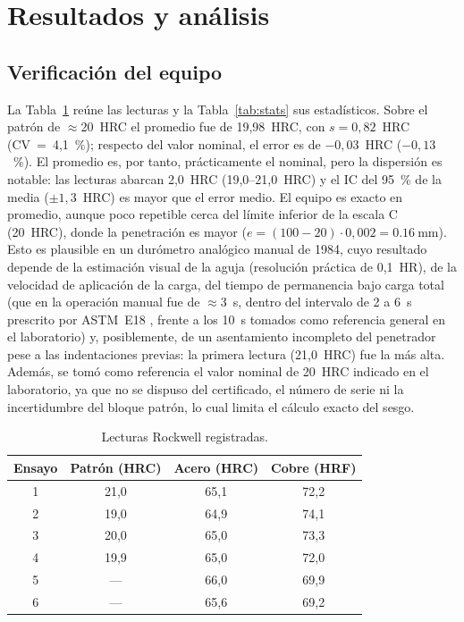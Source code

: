 \documentclass[journal,11pt]{IEEEtran}
\begin{document}
\section{Resultados y análisis}
\subsection{Verificación del equipo}
La Tabla~\ref{tab:datos} reúne las lecturas y la Tabla~\ref{tab:stats} sus estadísticos. Sobre el patrón de $\approx$20~HRC el promedio fue de 19,98~HRC, con $s=0{,}82$~HRC (CV~=~4,1~\%); respecto del valor nominal, el error es de $-0{,}03$~HRC ($-0{,}13$~\%). El promedio es, por tanto, prácticamente el nominal, pero la dispersión es notable: las lecturas abarcan 2,0~HRC (19,0--21,0~HRC) y el IC del 95~\% de la media ($\pm1{,}3$~HRC) es mayor que el error medio. El equipo es exacto en promedio, aunque poco repetible cerca del límite inferior de la escala C (20~HRC), donde la penetración es mayor ($e=(100-20)\cdot0{,}002=\SI{0,16}{\milli\metre}$). Esto es plausible en un durómetro analógico manual de 1984, cuyo resultado depende de la estimación visual de la aguja (resolución práctica de 0,1~HR), de la velocidad de aplicación de la carga, del tiempo de permanencia bajo carga total (que en la operación manual fue de $\approx$3~s, dentro del intervalo de 2 a 6~s prescrito por ASTM~E18 \cite{astm18}, frente a los 10~s tomados como referencia general en el laboratorio) y, posiblemente, de un asentamiento incompleto del penetrador pese a las indentaciones previas: la primera lectura (21,0~HRC) fue la más alta. Además, se tomó como referencia el valor nominal de 20~HRC indicado en el laboratorio, ya que no se dispuso del certificado, el número de serie ni la incertidumbre del bloque patrón, lo cual limita el cálculo exacto del sesgo.

\begin{table}[!t]
\caption{Lecturas Rockwell registradas.}
\label{tab:datos}
\centering\footnotesize
\begin{tabular}{@{}cccc@{}}
\toprule
Ensayo & Patrón (HRC) & Acero (HRC) & Cobre (HRF)\\
\midrule
1 & 21,0 & 65,1 & 72,2\\
2 & 19,0 & 64,9 & 74,1\\
3 & 20,0 & 65,0 & 73,3\\
4 & 19,9 & 65,0 & 72,0\\
5 & --- & 66,0 & 69,9\\
6 & --- & 65,6 & 69,2\\
\bottomrule
\end{tabular}
\end{table}
\end{document}
